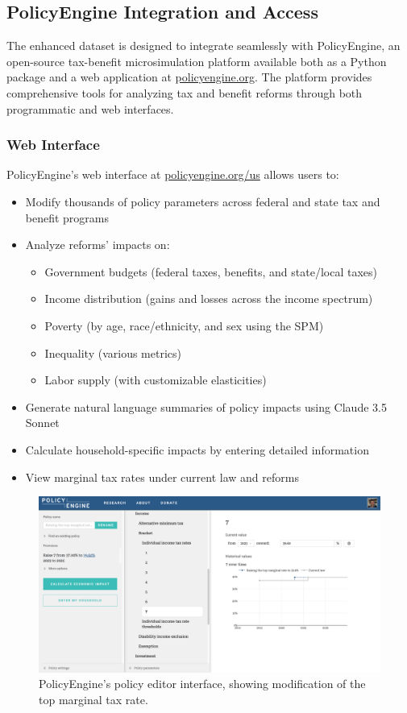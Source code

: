 \subsection{PolicyEngine Integration and Access}

The enhanced dataset is designed to integrate seamlessly with PolicyEngine, an open-source tax-benefit microsimulation platform available both as a Python package and a web application at \url{policyengine.org}. The platform provides comprehensive tools for analyzing tax and benefit reforms through both programmatic and web interfaces.

\subsubsection{Web Interface}

PolicyEngine's web interface at \url{policyengine.org/us} allows users to:
\begin{itemize}
    \item Modify thousands of policy parameters across federal and state tax and benefit programs
    \item Analyze reforms' impacts on:
    \begin{itemize}
        \item Government budgets (federal taxes, benefits, and state/local taxes)
        \item Income distribution (gains and losses across the income spectrum)
        \item Poverty (by age, race/ethnicity, and sex using the SPM)
        \item Inequality (various metrics)
        \item Labor supply (with customizable elasticities)
    \end{itemize}
    \item Generate natural language summaries of policy impacts using Claude 3.5 Sonnet
    \item Calculate household-specific impacts by entering detailed information
    \item View marginal tax rates under current law and reforms
\end{itemize}

\begin{figure}[h]
    \centering
    \includegraphics[width=\textwidth]{figures/policyengine_policy.png}
    \caption{PolicyEngine's policy editor interface, showing modification of the top marginal tax rate.}
    \label{fig:policyengine_policy}
\end{figure}

